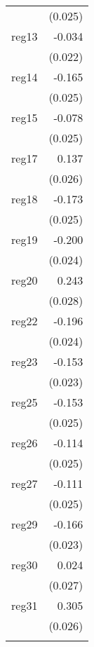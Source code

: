 {\begin{longtable}{l*{1}{D{.}{.}{-1}}}
            &     (0.025)         \\
\addlinespace
reg13       &      -0.034         \\
            &     (0.022)         \\
\addlinespace
reg14       &      -0.165\sym{***}\\
            &     (0.025)         \\
\addlinespace
reg15       &      -0.078\sym{**} \\
            &     (0.025)         \\
\addlinespace
reg17       &       0.137\sym{***}\\
            &     (0.026)         \\
\addlinespace
reg18       &      -0.173\sym{***}\\
            &     (0.025)         \\
\addlinespace
reg19       &      -0.200\sym{***}\\
            &     (0.024)         \\
\addlinespace
reg20       &       0.243\sym{***}\\
            &     (0.028)         \\
\addlinespace
reg22       &      -0.196\sym{***}\\
            &     (0.024)         \\
\addlinespace
reg23       &      -0.153\sym{***}\\
            &     (0.023)         \\
\addlinespace
reg25       &      -0.153\sym{***}\\
            &     (0.025)         \\
\addlinespace
reg26       &      -0.114\sym{***}\\
            &     (0.025)         \\
\addlinespace
reg27       &      -0.111\sym{***}\\
            &     (0.025)         \\
\addlinespace
reg29       &      -0.166\sym{***}\\
            &     (0.023)         \\
\addlinespace
reg30       &       0.024         \\
            &     (0.027)         \\
\addlinespace
reg31       &       0.305\sym{***}\\
            &     (0.026)         \\
\addlinespace

\end{longtable}}
